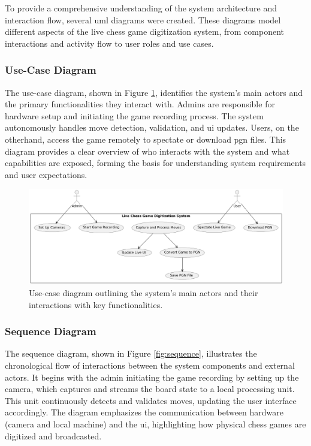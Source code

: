 To provide a comprehensive understanding of the system architecture and interaction flow, several \gls{uml} diagrams were created. These diagrams model different aspects of the live chess game digitization system, from component interactions and activity flow to user roles and use cases.



\subsubsection*{Use-Case Diagram}
\label{subsubsec:use-case-diagram}

The use-case diagram, shown in Figure \ref{fig:use-case}, identifies the system’s main actors and the primary functionalities they interact with. Admins are responsible for hardware setup and initiating the game recording process. The system autonomously handles move detection, validation, and \gls{ui} updates. Users, on the otherhand, access the game remotely to spectate or download \gls{pgn} files. This diagram provides a clear overview of who interacts with the system and what capabilities are exposed, forming the basis for understanding system requirements and user expectations.

\begin{figure}[h!]
    \centering
    \includegraphics[width=0.75\linewidth]{figures/results/uml/use-case.png}
    \caption[Use-case diagram]{Use-case diagram outlining the system’s main actors and their interactions with key functionalities.}
    \label{fig:use-case}
\end{figure}  

\subsubsection*{Sequence Diagram}
\label{subsubsec:sequence-diagram}

The sequence diagram, shown in Figure \ref{fig:sequence}, illustrates the chronological flow of interactions between the system components and external actors. It begins with the admin initiating the game recording by setting up the camera, which captures and streams the board state to a local processing unit. This unit continuously detects and validates moves, updating the user interface accordingly. The diagram emphasizes the communication between hardware (camera and local machine) and the \gls{ui}, highlighting how physical chess games are digitized and broadcasted.


